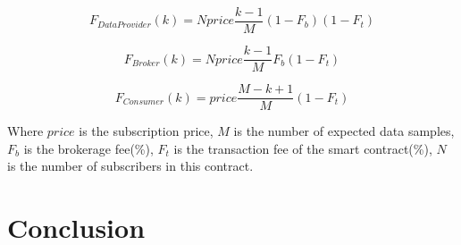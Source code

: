 \documentclass[journal,a4paper]{IEEEtran}
\begin{document}
\begin{equation}
F_{DataProvider}(k) = N price \frac{k-1}{M} (1-F_{b}) (1-F_{t})
\end{equation}

\begin{equation}
F_{Broker}(k) = N price \frac{k-1}{M} F_{b} (1-F_{t})
\end{equation}

\begin{equation}
F_{Consumer}(k) = price \frac{M-k+1}{M} (1-F_{t})
\end{equation}

Where $price$  is the subscription price, $M$ is the number of expected data samples, $F_{b}$ is the brokerage fee(\%), $F_{t}$ is the transaction fee of the smart contract(\%), $N$ is the number of subscribers in this contract.

\section{Conclusion}



  







\end{document}
